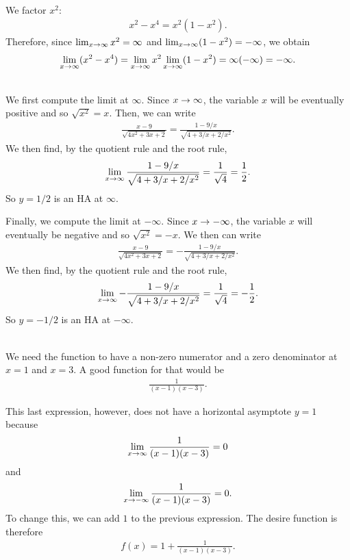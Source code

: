 	\spc
	
	\\
	We factor $x^2$:
		\begin{align*}
		x^2 - x^4 = x^2 (1 - x^2) .
		\end{align*}
	Therefore, since $\lim_{x \rightarrow \infty} x^2 = \infty$ and $\lim_{x \rightarrow \infty} (1 - x^2) = -\infty$, we obtain
		\begin{align*}
		\lim_{x \rightarrow \infty} (x^2 - x^4) = \lim_{x \rightarrow \infty} x^2 \lim_{x \rightarrow \infty} (1 - x^2) = \infty (-\infty) = -\infty .
		\end{align*}
		
	\spc
	
	\\
	We first compute the limit at $\infty$. Since $x \rightarrow \infty$, the variable $x$ will be eventually positive and so $\sqrt{x^2} = x$. Then, we can write
		\begin{align*}
		\frac{x - 9}{\sqrt{4x^2 + 3x + 2}} = \frac{1 - 9/x}{\sqrt{4 + 3/x + 2/x^2}} .
		\end{align*}
	We then find, by the quotient rule and the root rule,
		\begin{align*}
		\lim_{x \rightarrow \infty} \frac{1 - 9/x}{\sqrt{4 + 3/x + 2/x^2}} = \frac{1}{\sqrt{4}} = \frac{1}{2} .
		\end{align*}
	So $y = 1/2$ is an HA at $\infty$.
	
	Finally, we compute the limit at $-\infty$. Since $x \rightarrow -\infty$, the variable $x$ will eventually be negative and so $\sqrt{x^2} = -x$. We then can write
		\begin{align*}
		\frac{x - 9}{\sqrt{4x^2 + 3x + 2}} = -\frac{1 - 9/x}{\sqrt{4 + 3/x + 2/x^2}}  .
		\end{align*}
	We then find, by the quotient rule and the root rule,
		\begin{align*}
		\lim_{x \rightarrow \infty}- \frac{1 - 9/x}{\sqrt{4 + 3/x + 2/x^2}} = \frac{1}{\sqrt{4}} = -\frac{1}{2} .
		\end{align*}
	So $y = -1/2$ is an HA at $-\infty$.
	
	\spc
	
	\\
	We need the function to have a non-zero numerator and a zero denominator at $x = 1$ and $x = 3$. A good function for that would be
		\begin{align*}
		\frac{1}{(x - 1)(x-3)} .
		\end{align*}
		
	This last expression, however, does not have a horizontal asymptote $y = 1$ because
		\begin{align*}
		\lim_{x \rightarrow \infty} \frac{1}{(x - 1)(x - 3)} = 0
		\end{align*}
	and
		\begin{align*}
		\lim_{x \rightarrow -\infty} \frac{1}{(x - 1) (x - 3)} = 0 .
		\end{align*}
	To change this, we can add $1$ to the previous expression. The desire function is therefore
		\begin{align*}
		f(x) = 1 + \frac{1}{(x - 1)(x - 3)} .
		\end{align*}
	
